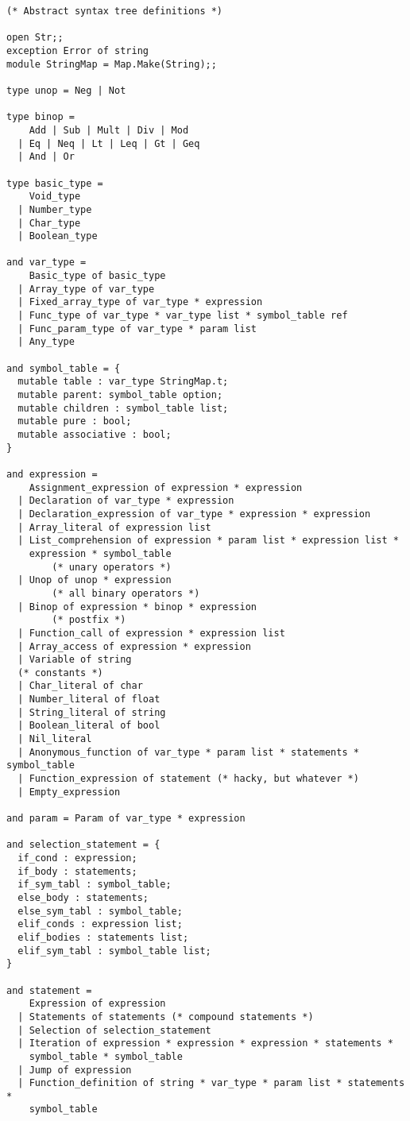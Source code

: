 \begin{verbatim}
(* Abstract syntax tree definitions *)

open Str;;
exception Error of string
module StringMap = Map.Make(String);;

type unop = Neg | Not

type binop =
    Add | Sub | Mult | Div | Mod
  | Eq | Neq | Lt | Leq | Gt | Geq
  | And | Or

type basic_type =
    Void_type
  | Number_type
  | Char_type
  | Boolean_type

and var_type =
    Basic_type of basic_type
  | Array_type of var_type
  | Fixed_array_type of var_type * expression
  | Func_type of var_type * var_type list * symbol_table ref 
  | Func_param_type of var_type * param list
  | Any_type

and symbol_table = {
  mutable table : var_type StringMap.t;
  mutable parent: symbol_table option; 
  mutable children : symbol_table list;
  mutable pure : bool;
  mutable associative : bool;
}

and expression =
    Assignment_expression of expression * expression
  | Declaration of var_type * expression
  | Declaration_expression of var_type * expression * expression
  | Array_literal of expression list
  | List_comprehension of expression * param list * expression list * 
    expression * symbol_table
        (* unary operators *)
  | Unop of unop * expression
        (* all binary operators *)
  | Binop of expression * binop * expression
        (* postfix *)
  | Function_call of expression * expression list
  | Array_access of expression * expression
  | Variable of string
  (* constants *)
  | Char_literal of char
  | Number_literal of float
  | String_literal of string
  | Boolean_literal of bool
  | Nil_literal
  | Anonymous_function of var_type * param list * statements * symbol_table
  | Function_expression of statement (* hacky, but whatever *)
  | Empty_expression

and param = Param of var_type * expression

and selection_statement = {
  if_cond : expression;
  if_body : statements;
  if_sym_tabl : symbol_table;
  else_body : statements;
  else_sym_tabl : symbol_table;
  elif_conds : expression list;
  elif_bodies : statements list;
  elif_sym_tabl : symbol_table list;
}

and statement =
    Expression of expression
  | Statements of statements (* compound statements *)
  | Selection of selection_statement
  | Iteration of expression * expression * expression * statements *
    symbol_table * symbol_table 
  | Jump of expression
  | Function_definition of string * var_type * param list * statements *
    symbol_table  


\end{verbatim}
